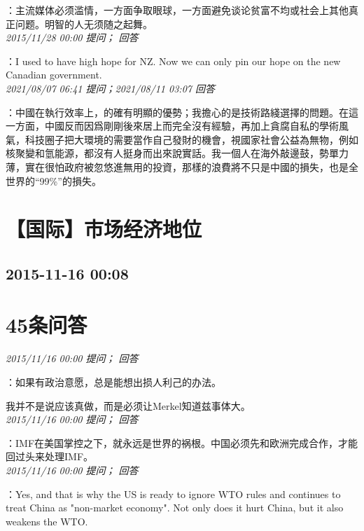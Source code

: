 \documentclass[twocolumn]{ctexart}
\begin{document}
：主流媒体必须滥情，一方面争取眼球，一方面避免谈论贫富不均或社会上其他真正问题。明智的人无须随之起舞。\\

\textit{\hfill\noindent\small 2015/11/28 00:00 提问； 回答}

：I used to have high hope for NZ. Now we can only pin our hope on the new Canadian government.\\

\textit{\hfill\noindent\small 2021/08/07 06:41 提问；2021/08/11 03:07 回答}

：中國在執行效率上，的確有明顯的優勢；我擔心的是技術路綫選擇的問題。在這一方面，中國反而因爲剛剛後來居上而完全沒有經驗，再加上貪腐自私的學術風氣，科技圈子把大環境的需要當作自己發財的機會，視國家社會公益為無物，例如核聚變和氫能源，都沒有人挺身而出來說實話。我一個人在海外敲邊鼓，勢單力薄，實在很怕政府被忽悠進無用的投資，那樣的浪費將不只是中國的損失，也是全世界的“99\%”的損失。
\\


\section{【国际】市场经济地位}
\subsection{2015-11-16 00:08}


\section{45条问答}

\textit{\hfill\noindent\small 2015/11/16 00:00 提问； 回答}

：如果有政治意愿，总是能想出损人利己的办法。

我并不是说应该真做，而是必须让Merkel知道兹事体大。\\

\textit{\hfill\noindent\small 2015/11/16 00:00 提问； 回答}

：IMF在美国掌控之下，就永远是世界的祸根。中国必须先和欧洲完成合作，才能回过头来处理IMF。\\

\textit{\hfill\noindent\small 2015/11/16 00:00 提问； 回答}

：Yes, and that is why the US is ready to ignore WTO rules and continues to treat China as "non-market economy". Not only does it hurt China, but it also weakens the WTO.
\end{document}
